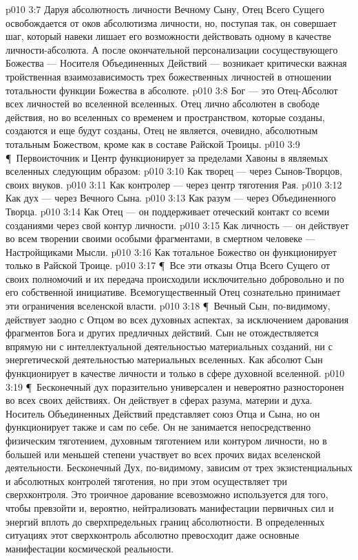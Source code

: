 \vs p010 3:7 Даруя абсолютность личности Вечному Сыну, Отец Всего Сущего освобождается от оков абсолютизма личности, но, поступая так, он совершает шаг, который навеки лишает его возможности действовать одному в качестве личности\hyp{}абсолюта. А после окончательной персонализации сосуществующего Божества --- Носителя Объединенных Действий --- возникает критически важная тройственная взаимозависимость трех божественных личностей в отношении тотальности функции Божества в абсолюте.
\vs p010 3:8 Бог --- это Отец\hyp{}Абсолют всех личностей во вселенной вселенных. Отец лично абсолютен в свободе действия, но во вселенных со временем и пространством, которые созданы, создаются и еще будут созданы, Отец не является, очевидно, абсолютным тотальным Божеством, кроме как в составе Райской Троицы.
\vs p010 3:9 \P\ Первоисточник и Центр функционирует за пределами Хавоны в являемых вселенных следующим образом:
\vs p010 3:10 \bibnobreakspace Как творец --- через Сынов\hyp{}Творцов, своих внуков.
\vs p010 3:11 \bibnobreakspace Как контролер --- через центр тяготения Рая.
\vs p010 3:12 \bibnobreakspace Как дух --- через Вечного Сына.
\vs p010 3:13 \bibnobreakspace Как разум --- через Объединенного Творца.
\vs p010 3:14 \bibnobreakspace Как Отец --- он поддерживает отеческий контакт со всеми созданиями через свой контур личности.
\vs p010 3:15 \bibnobreakspace Как личность --- он действует  во всем творении своими особыми фрагментами, в смертном человеке --- Настройщиками Мысли.
\vs p010 3:16 \bibnobreakspace Как тотальное Божество он функционирует только в Райской Троице.
\vs p010 3:17 \P\ Все эти отказы Отца Всего Сущего от своих полномочий и их передача происходили исключительно добровольно и по его собственной инициативе. Всемогущественный Отец сознательно принимает эти ограничения вселенской власти.
\vs p010 3:18 \P\ Вечный Сын, по\hyp{}видимому, действует заодно с Отцом во всех духовных аспектах, за исключением дарования фрагментов Бога и других предличных действий. Сын не отождествляется впрямую ни с интеллектуальной деятельностью материальных созданий, ни с энергетической деятельностью материальных вселенных. Как абсолют Сын функционирует в качестве личности и только в сфере духовной вселенной.
\vs p010 3:19 \P\ Бесконечный дух поразительно универсален и невероятно разносторонен во всех своих действиях. Он действует в сферах разума, материи и духа. Носитель Объединенных Действий представляет союз Отца и Сына, но он функционирует также и сам по себе. Он не занимается непосредственно физическим тяготением, духовным тяготением или контуром личности, но в большей или меньшей степени участвует во всех прочих видах вселенской деятельности. Бесконечный Дух, по\hyp{}видимому, зависим от трех экзистенциальных и абсолютных контролей тяготения, но при этом осуществляет три сверхконтроля. Это троичное дарование всевозможно используется для того, чтобы превзойти и, вероятно, нейтрализовать манифестации первичных сил и энергий вплоть до сверхпредельных границ абсолютности. В определенных ситуациях этот сверхконтроль абсолютно превосходит даже основные манифестации космической реальности.
